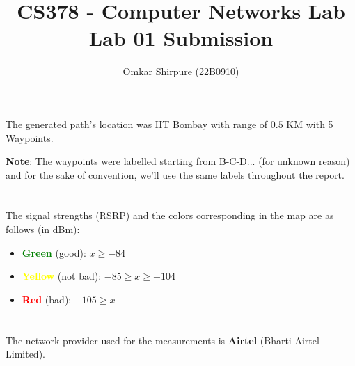 \documentclass[a4paper, 11pt]{article}
\title{CS378 - Computer Networks Lab \\ Lab 01 Submission}
\author{Omkar Shirpure (22B0910)}
\begin{document}
\maketitle
\vspace{5cm}
\tableofcontents

\newpage
\section{}
\vspace{1cm}
\begin{center}
\end{center}

\vspace{1cm}
The generated path's location was IIT Bombay with range of $0.5$ KM with 5 Waypoints. \\

\begin{tcolorbox}[colback=gray!20, colframe=gray!80]
    \textbf{Note}: The waypoints were labelled starting from B-C-D... (for unknown reason) and for the sake of convention, we'll use the same labels throughout the report.
\end{tcolorbox}

\newpage
\section{}
\vspace{1cm}
\begin{center}
\end{center}
\vspace{0.5cm}
The signal strengths (RSRP) and the colors corresponding in the map are as follows (in dBm): 
\begin{itemize}
    \item \textcolor{green}{\textbf{Green}} (good):\hspace{2.93cm} $x \geq -84$
    \item \textcolor{yellow}{\textbf{Yellow}} (not bad): \hspace{1.15cm}$-85 \geq x \geq -104$
    \item \textcolor{red}{\textbf{Red}} (bad): \hspace{2.15cm}$-105 \geq x$
\end{itemize}
\vspace{5pt}

\section{}
The network provider used for the measurements is \textbf{Airtel} (Bharti Airtel Limited).
\end{document}

